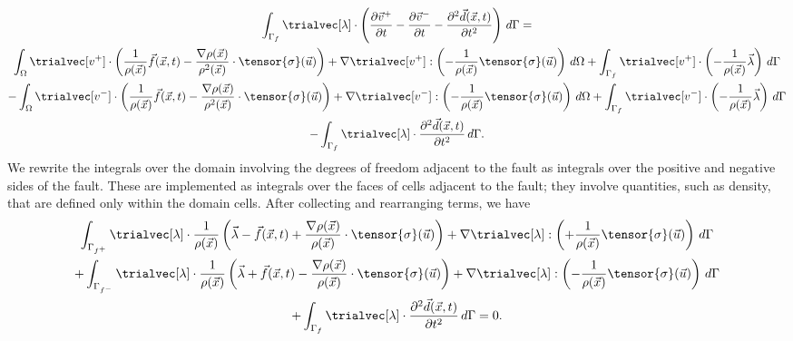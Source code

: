 \begin{multline}
  \int_{\Gamma_f} \trialvec[\lambda] \cdot \left(
    \frac{\partial \vec{v}^+}{\partial t} - \frac{\partial \vec{v}^-}{\partial t} -
    \frac{\partial^2 \vec{d}(\vec{x},t)}{\partial t^2} \right) \, d\Gamma = \\
  \int_\Omega \trialvec[v^+] \cdot \left( \frac{1}{\rho(\vec{x})} \vec{f}(\vec{x}, t)
    -\frac{\nabla \rho(\vec{x})}{\rho^2(\vec{x})} \cdot \tensor{\sigma}(\vec{u}) \right) 
  + \nabla \trialvec[v^+] : \left(-\frac{1}{\rho(\vec{x})} \tensor{\sigma}(\vec{u}) \right) \, d\Omega
  + \int_{\Gamma_f} \trialvec[v^+] \cdot \left(-\frac{1}{\rho(\vec{x})} \vec{\lambda} \right) \, d\Gamma \\
  - \int_\Omega \trialvec[v^-] \cdot \left( \frac{1}{\rho(\vec{x})} \vec{f}(\vec{x}, t)
  -\frac{\nabla \rho(\vec{x})}{\rho^2(\vec{x})} \cdot \tensor{\sigma}(\vec{u}) \right)
  + \nabla \trialvec[v^-] : \left(-\frac{1}{\rho(\vec{x})} \tensor{\sigma}(\vec{u}) \right) \, d\Omega
  + \int_{\Gamma_f} \trialvec[v^-] \cdot \left(-\frac{1}{\rho(\vec{x})} \vec{\lambda} \right) \, d\Gamma \\
  - \int_{\Gamma_f} \trialvec[\lambda] \cdot \frac{\partial^2 \vec{d}(\vec{x}, t)}{\partial t^2} \, d\Gamma.
\end{multline}
We rewrite the integrals over the domain involving the degrees of
freedom adjacent to the fault as integrals over the positive and
negative sides of the fault. These are implemented as integrals over
the faces of cells adjacent to the fault; they involve quantities,
such as density, that are defined only within the domain cells. After
collecting and rearranging terms, we have
\begin{multline}
  \label{eqn:elasticity:prescribed:slip:dynamic:DAE:weak:form}
  \int_{\Gamma_{f^+}} \trialvec[\lambda] \cdot \frac{1}{\rho(\vec{x})} \left(
    \vec{\lambda} - \vec{f}(\vec{x},t) + \frac{\nabla\rho(\vec{x})}{\rho(\vec{x})} \cdot \tensor{\sigma}(\vec{u}) \right)
  + \nabla \trialvec[\lambda] : \left(+\frac{1}{\rho(\vec{x})} \tensor{\sigma}(\vec{u}) \right) \, d\Gamma \\
  + \int_{\Gamma_{f^-}} \trialvec[\lambda] \cdot \frac{1}{\rho(\vec{x})} \left(
    \vec{\lambda} + \vec{f}(\vec{x},t) - \frac{\nabla\rho(\vec{x})}{\rho(\vec{x})} \cdot \tensor{\sigma}(\vec{u}) \right)
  + \nabla \trialvec[\lambda] : \left(-\frac{1}{\rho(\vec{x})} \tensor{\sigma}(\vec{u}) \right)  \, d\Gamma \\
  + \int_{\Gamma_f} \trialvec[\lambda] \cdot \frac{\partial^2 \vec{d}(\vec{x}, t)}{\partial t^2} \, d\Gamma
  = 0.
\end{multline}


